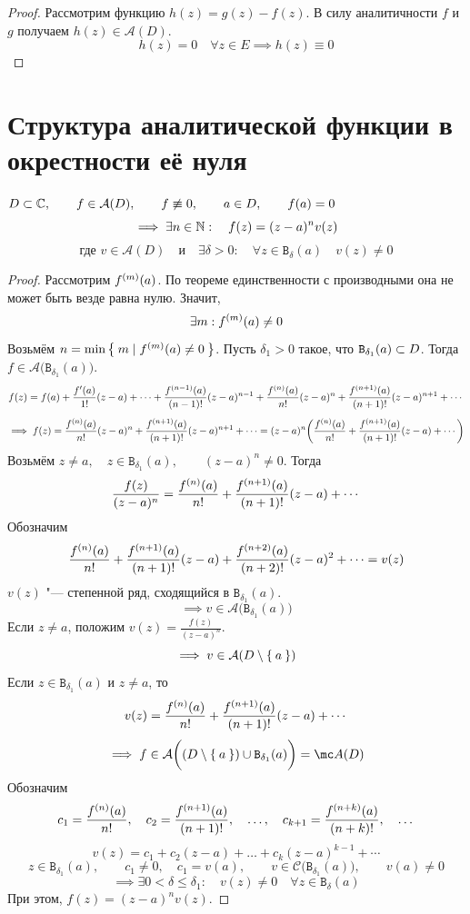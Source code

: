 \begin{proof}
	Рассмотрим функцию $ h(z) = g(z) - f(z) $. В силу аналитичности $ f $ и $ g $ получаем $h(z) \in \mathcal A(D) $.
	$$ h(z) = 0 \quad \forall z \in E \implies h(z) \equiv 0 $$
\end{proof}

\section{Структура аналитической функции в окрестности её нуля}

\begin{theorem}
	$ D \sub \Co, \qquad f \in \mathcal A(D), \qquad f \not\equiv 0, \qquad a \in D, \qquad f(a) = 0 $
	$$ \implies \exists n \in \N : \quad f(z) = (z - a)^n v(z) $$
	$$ \text{где } v \in \mathcal A(D) \quad \text{и} \quad \exists \delta > 0 : \quad \forall z \in \mathtt B_\delta(a) \quad v(z) \ne 0 $$
\end{theorem}

\begin{proof}
	Рассмотрим $ \nder[m]f(a) $. По теореме единственности с производными она не может быть везде равна нулю. Значит,
	$$ \exists m : \nder[m]f(a) \ne 0 $$
	Возьмём $ n = \min \set{m \mid \nder[m]f(a) \ne 0} $. Пусть $ \delta_1 > 0 $ такое, что $ \mathtt B_{\delta_1}(a) \sub D $. Тогда $ f \in \mathcal A \big( \mathtt B_{\delta_1}(a) \big) $.
	$$ f(z) = f(a) + \frac{f'(a)}{1!}(z - a) + \dots + \frac{\nder[n - 1]f(a)}{(n - 1)!}(z - a)^{n - 1} + \frac{\nder f(a)}{n!}(z - a)^n + \frac{\nder[n + 1]f(a)}{(n + 1)!}(z - a)^{n + 1} + \cdots $$
	$$ \implies f(z) = \frac{\nder f(a)}{n!}(z - a)^n + \frac{\nder[n + 1]f(a)}{(n + 1)!}(z - a)^{n + 1} + \cdots = (z - a)^n \bigg( \frac{\nder f(a)}{n!} + \frac{\nder[n + 1]f(a)}{(n + 1)!}(z - a) + \cdots \bigg) $$
	Возьмём $ z \ne a, \quad z \in \mathtt B_{\delta_1}(a), \qquad (z - a)^n \ne 0 $. Тогда
	$$ \frac{f(z)}{(z - a)^n} = \frac{\nder f(a)}{n!} + \frac{\nder[n + 1]f(a)}{(n + 1)!}(z - a) + \cdots $$
	Обозначим
	$$ \frac{\nder f(a)}{n!} + \frac{\nder[n + 1]f(a)}{(n + 1)!}(z - a) + \frac{\nder[n + 2]f(a)}{(n + 2)!}(z - a)^2 + \dots = v(z) $$
	$ v(z) $ "--- степенной ряд, сходящийся в $ \mathtt B_{\delta_1}(a) $.
	$$ \implies v \in \mathcal A \big( \mathtt B_{\delta_1}(a) \big) $$
	Если $ z \ne a $, положим $ v(z) = \frac{f(z)}{(z - a)^n} $.
	$$ \implies v \in \mathcal A(D \setminus \set a) $$
	Если $ z \in \mathtt B_{\delta_1}(a) $ и $ z \ne a $, то
	$$ v(z) = \frac{\nder f(a)}{n!} + \frac{\nder[n + 1]f(a)}{(n + 1)!}(z - a) + \cdots $$
	$$ \implies f \in \mathcal A \bigg( (D \setminus \set a) \cup \mathtt B_{\delta_1}(a) \bigg) = \mc A(D) $$
	Обозначим
	$$ c_1 = \frac{\nder f(a)}{n!}, \quad c_2 = \frac{\nder[n + 1]f(a)}{(n + 1)!}, \quad \dots, \quad c_{k + 1} = \frac{\nder[n + k]f(a)}{(n + k)!}, \quad \dots $$
	$$ v(z) = c_1 + c_2(z - a) + \dots + c_k(z - a)^{k - 1} + \cdots $$
	$$ z \in \mathtt B_{\delta_1}(a), \qquad c_1 \ne 0, \quad c_1 = v(a), \qquad v \in \mathcal C \big( \mathtt B_{\delta_1}(a) \big), \qquad v(a) \ne 0 $$
	$$ \implies \exists 0 < \delta \le \delta_1 : \quad v(z) \ne 0 \quad \forall z \in \mathtt B_\delta(a) $$
	При этом, $ f(z) = (z - a)^nv(z) $.
\end{proof}

